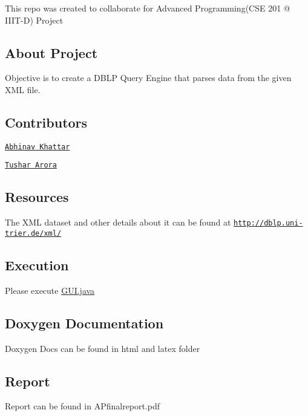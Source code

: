 This repo was created to collaborate for Advanced Programming(C\+SE 201 @ I\+I\+I\+T-\/D) Project

\subsection*{About Project}

Objective is to create a D\+B\+LP Query Engine that parses data from the given X\+ML file.

\subsection*{Contributors}


\begin{DoxyItemize}
\item \href{https://github.com/aklife97}{\tt Abhinav Khattar}
\item \href{https://github.com/tushar1208}{\tt Tushar Arora}
\end{DoxyItemize}

\subsection*{Resources}

The X\+ML dataset and other details about it can be found at ​​\href{http://dblp.uni-trier.de/xml/}{\tt http\+://dblp.\+uni-\/trier.\+de/xml/}

\subsection*{Execution}

Please execute \hyperlink{GUI_8java}{G\+U\+I.\+java}

\subsection*{Doxygen Documentation}

Doxygen Docs can be found in html and latex folder

\subsection*{Report}

Report can be found in A\+Pfinalreport.\+pdf 